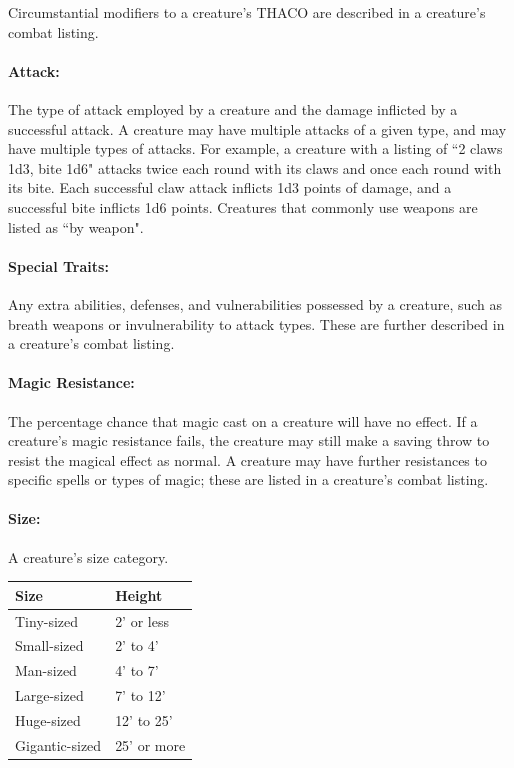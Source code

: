 \begin{multicols}{2}
\begin{minipage}{\columnwidth}
\end{minipage}

Circumstantial modifiers to a creature's THACO are described in a creature's combat listing.

\paragraph{Attack:} The type of attack employed by a creature and the damage inflicted by a successful attack. A creature may have multiple attacks of a given type, and may have multiple types of attacks. For example, a creature with a listing of ``2 claws 1d3, bite 1d6" attacks twice each round with its claws and once each round with its bite. Each successful claw attack inflicts 1d3 points of damage, and a successful bite inflicts 1d6 points. Creatures that commonly use weapons are listed as ``by weapon".

\paragraph{Special Traits:} Any extra abilities, defenses, and vulnerabilities possessed by a creature, such as breath weapons or invulnerability to attack types. These are further described in a creature's combat listing.

\paragraph{Magic Resistance:} The percentage chance that magic cast on a creature will have no effect.  If a creature's magic resistance fails, the creature may still make a saving throw to resist the magical effect as normal. A creature may have further resistances to specific spells or types of magic; these are listed in a creature's combat listing.

\paragraph{Size:} A creature's size category.

\noindent
\begin{minipage}{\columnwidth}

\noindent
\begin{tabular}{|p{}|p{}|}
\hline
Size	& Height \\
\hline\hline
\rowcolor[gray]{.9}Tiny-sized	& 2' or less \\
Small-sized	& 2' to 4' \\
\rowcolor[gray]{.9}Man-sized	& 4' to 7' \\
Large-sized & 7' to 12' \\
\rowcolor[gray]{.9}Huge-sized	& 12' to 25' \\
Gigantic-sized	& 25' or more \\
\hline
\end{tabular}


\end{minipage}
\end{multicols}
